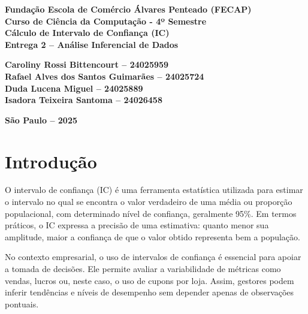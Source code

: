 \documentclass[12pt]{article}
\begin{document}
\begin{center}
\textbf{Fundação Escola de Comércio Álvares Penteado (FECAP)}\\
\textbf{Curso de Ciência da Computação - 4º Semestre}\\[2cm]

\vspace*{\fill}
\textbf{\Large Cálculo de Intervalo de Confiança (IC)}\\[0.5cm]
\textbf{Entrega 2 – Análise Inferencial de Dados}\\[2cm]
\end{center}


\noindent\hspace*{6cm}\textbf{Caroliny Rossi Bittencourt – 24025959}\\
\hspace*{6cm}\textbf{Rafael Alves dos Santos Guimarães – 24025724}\\
\hspace*{6cm}\textbf{Duda Lucena Miguel – 24025889}\\
\hspace*{6cm}\textbf{Isadora Teixeira Santoma – 24026458}\\[2cm]

\vspace*{\fill}

\begin{center}
\vfill
\textbf{São Paulo – 2025}
\end{center}

\newpage
\onehalfspacing

\section*{Introdução}

O intervalo de confiança (IC) é uma ferramenta estatística utilizada para estimar o intervalo no qual se encontra o valor verdadeiro de uma média ou proporção populacional, com determinado nível de confiança, geralmente 95\%.  
Em termos práticos, o IC expressa a precisão de uma estimativa: quanto menor sua amplitude, maior a confiança de que o valor obtido representa bem a população.

No contexto empresarial, o uso de intervalos de confiança é essencial para apoiar a tomada de decisões. Ele permite avaliar a variabilidade de métricas como vendas, lucros ou, neste caso, o uso de cupons por loja. Assim, gestores podem inferir tendências e níveis de desempenho sem depender apenas de observações pontuais.
\end{document}
